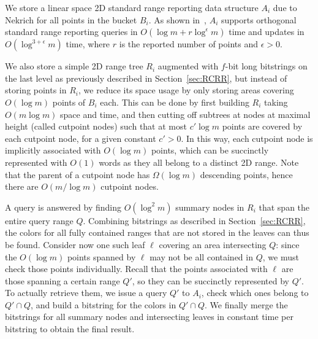 We store a linear space 2D standard range reporting data structure $A_i$ due to Nekrich \cite{nekrich2009orthogonal} for all points in the bucket $B_i$. As shown in~\cite{nekrich2009orthogonal}, $A_i$ supports orthogonal standard range reporting queries in $O(\log m + r \log ^{\epsilon} m)$ time and updates in $O(\log ^{3+\epsilon} m)$ time, where $r$ is the reported number of points and $\epsilon > 0$.



We also store a simple 2D range tree $R_i$ augmented with $f$-bit long bitstrings on the last level as previously described in Section~\ref{sec:RCRR}, but instead of storing points in $R_i$, we reduce its space usage by only storing areas covering $O(\log m)$ points of $B_i$ each. This can be done by first building $R_i$ taking $O(m \log m)$ space and time, and then cutting off subtrees at nodes at maximal height (called cutpoint nodes) such that at most $c' \log m$ points are covered by each cutpoint node, for a given constant $c'>0$. In this way, each cutpoint node is implicitly associated with $O(\log m)$ points, which can be succinctly represented with $O(1)$ words as they all belong to a distinct 2D range. Note that the parent of a cutpoint node has $\Omega(\log m)$ descending points, hence there are $O(m/\log m)$ cutpoint nodes.

A query is answered by finding $O(\log^2 m)$ summary nodes in $R_i$ that span the entire query range $Q$. Combining bitstrings as described in Section~\ref{sec:RCRR}, the colors for all fully contained ranges that are not stored in the leaves can thus be found. Consider now one such leaf $\ell$ covering an area intersecting $Q$: since the $O(\log m)$ points spanned by $\ell$ may not be all contained in $Q$, we must check those points individually. Recall that the points associated with $\ell$ are those spanning a certain range $Q'$, so they can be succinctly represented by $Q'$. To actually retrieve them, we issue a query $Q'$ to $A_i$, check which ones belong to $Q' \cap Q$, and build a bitstring for the colors in $Q' \cap Q$. We finally merge the bitstrings for all summary nodes and intersecting leaves in constant time per bitstring to obtain the final result.

